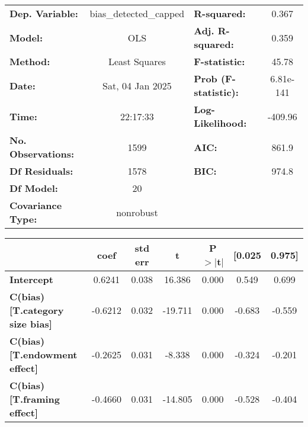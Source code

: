 \begin{center}
\begin{tabular}{lclc}
\toprule
\textbf{Dep. Variable:}                   & bias\_detected\_capped & \textbf{  R-squared:         } &     0.367   \\
\textbf{Model:}                           &          OLS           & \textbf{  Adj. R-squared:    } &     0.359   \\
\textbf{Method:}                          &     Least Squares      & \textbf{  F-statistic:       } &     45.78   \\
\textbf{Date:}                            &    Sat, 04 Jan 2025    & \textbf{  Prob (F-statistic):} & 6.81e-141   \\
\textbf{Time:}                            &        22:17:33        & \textbf{  Log-Likelihood:    } &   -409.96   \\
\textbf{No. Observations:}                &           1599         & \textbf{  AIC:               } &     861.9   \\
\textbf{Df Residuals:}                    &           1578         & \textbf{  BIC:               } &     974.8   \\
\textbf{Df Model:}                        &             20         & \textbf{                     } &             \\
\textbf{Covariance Type:}                 &       nonrobust        & \textbf{                     } &             \\
\bottomrule
\end{tabular}
\begin{tabular}{lcccccc}
                                          & \textbf{coef} & \textbf{std err} & \textbf{t} & \textbf{P$> |$t$|$} & \textbf{[0.025} & \textbf{0.975]}  \\
\midrule
\textbf{Intercept}                        &       0.6241  &        0.038     &    16.386  &         0.000        &        0.549    &        0.699     \\
\textbf{C(bias)[T.category size bias]}    &      -0.6212  &        0.032     &   -19.711  &         0.000        &       -0.683    &       -0.559     \\
\textbf{C(bias)[T.endowment effect]}      &      -0.2625  &        0.031     &    -8.338  &         0.000        &       -0.324    &       -0.201     \\
\textbf{C(bias)[T.framing effect]}        &      -0.4660  &        0.031     &   -14.805  &         0.000        &       -0.528    &       -0.404     \\

\end{tabular}
\end{center}
